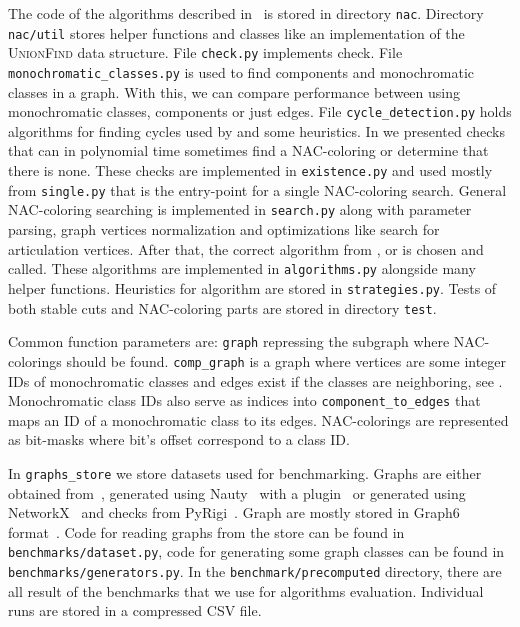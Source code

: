 The code of the algorithms described in~
is stored in directory \texttt{nac}.
%
Directory \texttt{nac/util} stores helper functions and classes
like an implementation of the \textsc{UnionFind} data structure.
%
File \texttt{check.py} implements \IsNACColoring{} check.
%
File \texttt{monochromatic\_classes.py} is used to find \trcon{} components
and monochromatic classes in a graph. With this, we can compare performance
between using monochromatic classes, \trcon{} components or just edges.
%
File \texttt{cycle\_detection.py} holds algorithms for finding cycles
used by 
and some heuristics.
%
In 
we presented checks that can in polynomial time
sometimes find a NAC-coloring or determine that there is none.
These checks are implemented in \texttt{existence.py} and
used mostly from \texttt{single.py} that is the entry-point
for a single NAC-coloring search.
%
General NAC-coloring searching is implemented in \texttt{search.py}
along with parameter parsing, graph vertices normalization and
optimizations like search for articulation vertices.
After that, the correct algorithm from \Naive{}, \NaiveCycles{} or \Subgraphs{}
is chosen and called.
%
These algorithms are implemented in \texttt{algorithms.py} alongside many helper functions.
Heuristics for \Subgraphs{} algorithm are stored in \texttt{strategies.py}.
%
Tests of both stable cuts and NAC-coloring parts are stored in directory \texttt{test}.

Common function parameters are:
\texttt{graph} repressing the subgraph where NAC-colorings should be found.
%
\texttt{comp\_graph} is a graph where vertices are some integer IDs of monochromatic classes
and edges exist if the classes are neighboring,
see .
%
Monochromatic class IDs also serve as indices into \texttt{component\_to\_edges}
that maps an ID of a monochromatic class to its edges.
%
NAC-colorings are represented as bit-masks where bit's offset correspond to a class ID\@.

In \texttt{graphs\_store} we store datasets used for benchmarking.
Graphs are either obtained from~\cite{extremal_graphs},
generated using Nauty~\cite{nauty} with a plugin~\cite{nauty_plugin}
or generated using NetworkX~\cite{networkx} and checks from PyRigi~\cite{pyrigi}.
Graph are mostly stored in Graph6 format~\cite{graph6}.
Code for reading graphs from the store can be found in \texttt{benchmarks/dataset.py},
code for generating some graph classes can be found in  \texttt{benchmarks/generators.py}.
In the \texttt{benchmark/precomputed} directory, there are all result of the benchmarks that
we use for algorithms evaluation.
Individual runs are stored in a compressed CSV file.

